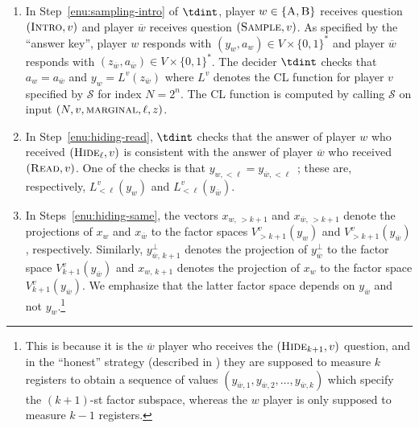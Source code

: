 \documentclass[11pt]{article}
\theoremstyle{definition}
\newcommand{\sampler}{\mathcal{S}}
\newcommand{\gamestyle}[1]{\ensuremath{\textsc{#1}}\xspace}
\newcommand{\labelstyle}[1]{\ensuremath{\textsc{#1}}\xspace}
\newcommand{\trole}{\ensuremath{v}}
\newcommand{\alice}{\labelstyle{A}}
\newcommand{\bob}{\labelstyle{B}}
\newcommand{\ab}{\{\alice, \bob\}}
\newcommand{\typestyle}[1]{\ensuremath{\textsc{#1}}\xspace}
\newcommand{\Sample}{\typestyle{Sample}}
\newcommand{\Read}{\typestyle{Read}}
\newcommand{\Hide}[1]{\typestyle{Hide}_{#1}}
\newcommand{\Introspect}{\typestyle{Intro}}
\begin{document}
\begin{enumerate}
\item In Step~\ref{enu:sampling-intro} of $\tdint$, player $w \in \ab$
  receives question $(\Introspect,\trole)$ and player $\overline{w}$ receives
  question $(\Sample,\trole)$.
  As specified by the ``answer key'', player $w$ responds with $(y_w,a_w) \in V
  \times \{0,1\}^*$ and player $\overline{w}$ responds with
  $(z_{\overline{w}},a_{\overline{w}}) \in V \times \{0,1\}^*$.
  The decider $\tdint$ checks that $a_w = a_{\overline{w}}$ and $y_w =
  L^\trole(z_{\overline{w}})$ where $L^\trole$ denotes the CL function for
  player $\trole$ specified by $\sampler$ for index $N = 2^n$.
  The CL function is computed by calling $\sampler$ on input
  $(N, \trole, \gamestyle{marginal}, \ell, z)$.

\item In Step~\ref{enu:hiding-read}, $\tdint$ checks that the answer of
  player $w$ who received $(\Hide{\ell},\trole)$ is consistent with the answer
  of player $\overline{w}$ who received $(\Read,\trole)$. One of the checks is
  that $y_{w,< \ell} = y_{\overline{w},<\ell}$~; these are, respectively, 
  $L^\trole_{< \ell}(y_w)$ and $L^\trole_{< \ell}(y_{\overline{w}})$.
  


\item\label{enu:decider-perp}
  \def\Lfunc{L^{\trole}_{k+1,\, y_{\overline{w},\, \le k}}}

  In Steps~\ref{enu:hiding-same}, the vectors $x_{w,\, >k+1}$ and
  $x_{\overline{w},\, >k+1}$ denote the projections of $x_w$ and
  $x_{\overline{w}}$ to the factor spaces $V^\trole_{> k+1}(y_w)$ and $V^\trole_{>
    k+1}(y_{\overline{w}})$, respectively.
  Similarly, $y_{\overline{w},\, k+1}^\perp$ denotes the projection of
  $y_{\overline{w}}^\perp$ to the factor space $V^\trole_{k+1} (y_{\overline{w}})$ and
  $x_{w,\, k+1}$ denotes the projection of $x_{w}$ to
 the factor space $V^\trole_{k+1}(y_{\overline{w}})$. We emphasize that the latter
 factor space depends on $y_{\overline{w}}$ and not $y_w$.\footnote{ This is because it is the $\overline{w}$ player
 who receives the $(\Hide{k+1},\trole)$ question, and in the ``honest'' strategy (described in ) 
 they are supposed to measure $k$ registers to obtain a sequence of values $(y_{\overline{w},1},y_{\overline{w},2},\ldots,y_{\overline{w},k})$ 
 which specify the $(k+1)$-st factor subspace, whereas the $w$ player is only supposed to measure $k-1$ registers.
 }



\end{enumerate}
\end{document}

